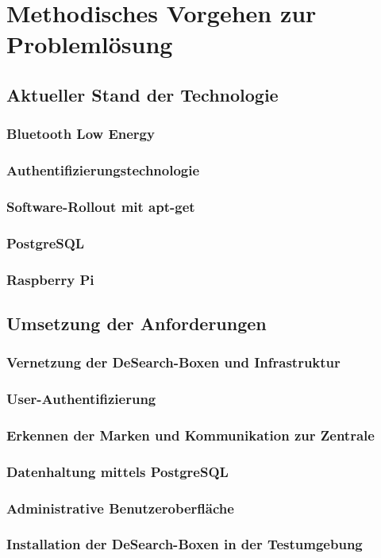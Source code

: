 \section{Methodisches Vorgehen zur Problemlösung}

\subsection{Aktueller Stand der Technologie}

\subsubsection{Bluetooth Low Energy}
\subsubsection{Authentifizierungstechnologie}
\subsubsection{Software-Rollout mit apt-get}
\subsubsection{PostgreSQL}
\subsubsection{Raspberry Pi}

\subsection{Umsetzung der Anforderungen}

\subsubsection{Vernetzung der DeSearch-Boxen und Infrastruktur}
\subsubsection{User-Authentifizierung}
\subsubsection{Erkennen der Marken und Kommunikation zur Zentrale}
\subsubsection{Datenhaltung mittels PostgreSQL}
\subsubsection{Administrative Benutzeroberfläche}
\subsubsection{Installation der DeSearch-Boxen in der Testumgebung}
